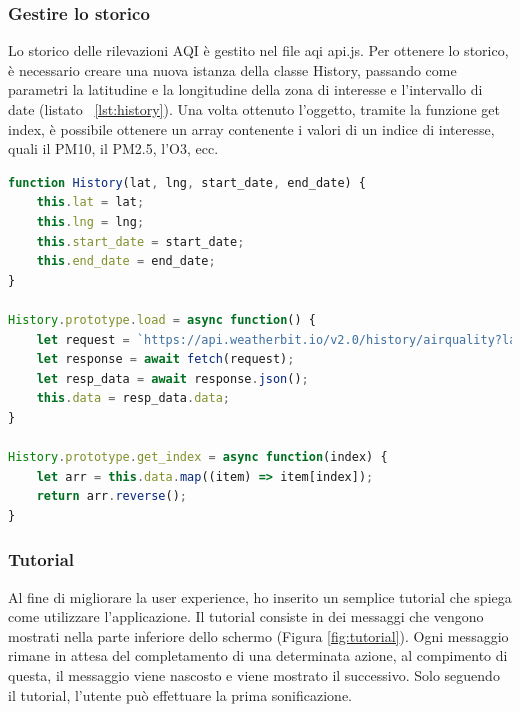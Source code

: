 \subsubsection{Gestire lo storico}
Lo storico delle rilevazioni AQI è gestito nel file aqi api.js.
Per ottenere lo storico, è necessario creare una nuova istanza della classe History, passando come parametri la latitudine e la longitudine della zona di interesse e l'intervallo di date (listato ~\ref{lst:history}).
Una volta ottenuto l'oggetto, tramite la funzione get index, è possibile ottenere un array contenente i valori di un indice di interesse, quali il PM10, il PM2.5, l'O3, ecc.
\begin{lstlisting}[language=Javascript,caption={La classe History.},label={lst:history}]
function History(lat, lng, start_date, end_date) {
    this.lat = lat;
    this.lng = lng;
    this.start_date = start_date;
    this.end_date = end_date;
}

History.prototype.load = async function() {
    let request = `https://api.weatherbit.io/v2.0/history/airquality?lat=${this.lat}&lon=${this.lng}&start_date=${this.start_date}&end_date=${this.end_date}&tz=local&key=${weatherbit_key}`;
    let response = await fetch(request);
    let resp_data = await response.json();
    this.data = resp_data.data;
}

History.prototype.get_index = async function(index) {
    let arr = this.data.map((item) => item[index]);
    return arr.reverse();
}
\end{lstlisting}

\subsubsection{Tutorial}
Al fine di migliorare la user experience, ho inserito un semplice tutorial che spiega come utilizzare l'applicazione.
Il tutorial consiste in dei messaggi che vengono mostrati nella parte inferiore dello schermo (Figura \ref{fig:tutorial}).
Ogni messaggio rimane in attesa del completamento di una determinata azione, al compimento di questa, il messaggio viene nascosto e viene mostrato il successivo.
Solo seguendo il tutorial, l'utente può effettuare la prima sonificazione.



